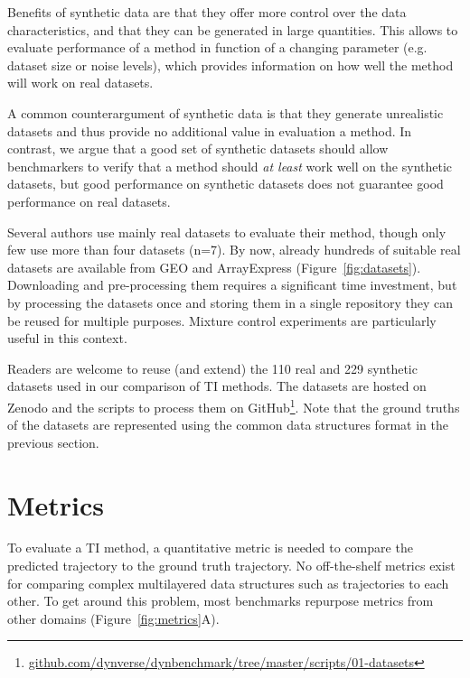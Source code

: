Benefits of synthetic data are that they offer more control over the data characteristics, and that they can be generated in large quantities. This allows to evaluate performance of a method in function of a changing parameter (e.g. dataset size or noise levels), which provides information on how well the method will work on real datasets.

A common counterargument of synthetic data is that they generate unrealistic datasets and thus provide no additional value in evaluation a method. In contrast, we argue that a good set of synthetic datasets should allow benchmarkers to verify that a method should \textit{at least} work well on the synthetic datasets, but good performance on synthetic datasets does not guarantee good performance on real datasets.

Several authors use mainly real datasets to evaluate their method, though only few use more than four datasets (n=7). 
By now, already hundreds of suitable real datasets are available from GEO and ArrayExpress (Figure~\ref{fig:datasets}). Downloading and pre-processing them requires a significant time investment, but by processing the datasets once and storing them in a single repository they can be reused for multiple purposes. Mixture control experiments\cite{tian_benchmarkingsinglecell_2019} are particularly useful in this context.

Readers are welcome to reuse (and extend) the 110 real and 229 synthetic datasets used in our comparison of TI methods\cite{saelens_comparisonsinglecelltrajectory_2019}. The datasets are hosted on Zenodo\cite{cannoodt_singlecellomicsdatasets_2018} and the scripts to process them on GitHub\footnote{\href{https://github.com/dynverse/dynbenchmark/tree/master/scripts/01-datasets}{github.com/dynverse/dynbenchmark/tree/master/scripts/01-datasets}}. Note that the ground truths of the datasets are represented using the common data structures format in the previous section.

\section{Metrics}
To evaluate a TI method, a quantitative metric is needed to compare the predicted trajectory to the ground truth trajectory. No off-the-shelf metrics exist for comparing complex multilayered data structures such as trajectories to each other.
To get around this problem, most benchmarks repurpose metrics from other domains (Figure~\ref{fig:metrics}A).

